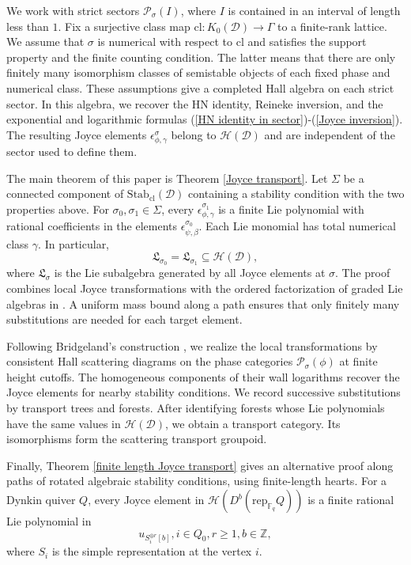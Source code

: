 \documentclass[a4paper,12pt]{amsart}
\numberwithin{equation}{section}
\newcommand{\rep}{\mathrm{rep}}
\newcommand{\Stab}{\mathrm{Stab}}
\newcommand{\cl}{\mathrm{cl}}
\newcommand{\1}{\mathbf{1}}
\begin{document}
We work with strict sectors $\mathcal{P}_\sigma(I)$, where $I$ is contained in an interval of length less than $1$. Fix a surjective class map $\cl:K_0(\mathcal{D})\rightarrow\Gamma$ to a finite-rank lattice. We assume that $\sigma$ is numerical with respect to $\cl$ and satisfies the support property and the finite counting condition. The latter means that there are only finitely many isomorphism classes of semistable objects of each fixed phase and numerical class. These assumptions give a completed Hall algebra on each strict sector. In this algebra, we recover the HN identity, Reineke inversion, and the exponential and logarithmic formulas (\ref{HN identity in sector})-(\ref{Joyce inversion}). The resulting Joyce elements $\epsilon^\sigma_{\phi,\gamma}$ belong to $\mathcal{H}(\mathcal{D})$ and are independent of the sector used to define them.

The main theorem of this paper is Theorem \ref{Joyce transport}. Let $\Sigma$ be a connected component of $\Stab_\cl(\mathcal{D})$ containing a stability condition with the two properties above. For $\sigma_0,\sigma_1\in\Sigma$, every $\epsilon^{\sigma_1}_{\phi,\gamma}$ is a finite Lie polynomial with rational coefficients in the elements $\epsilon^{\sigma_0}_{\psi,\beta}$. Each Lie monomial has total numerical class $\gamma$. In particular,
\[\mathfrak{L}_{\sigma_0}=\mathfrak{L}_{\sigma_1}\subseteq\mathcal{H}(\mathcal{D}),\]
where $\mathfrak{L}_\sigma$ is the Lie subalgebra generated by all Joyce elements at $\sigma$. The proof combines local Joyce transformations with the ordered factorization of graded Lie algebras in \cite{KS2008}. A uniform mass bound along a path ensures that only finitely many substitutions are needed for each target element.

Following Bridgeland's construction \cite{Bri2017}, we realize the local transformations by consistent Hall scattering diagrams on the phase categories $\mathcal{P}_\sigma(\phi)$ at finite height cutoffs. The homogeneous components of their wall logarithms recover the Joyce elements for nearby stability conditions. We record successive substitutions by transport trees and forests. After identifying forests whose Lie polynomials have the same values in $\mathcal{H}(\mathcal{D})$, we obtain a transport category. Its isomorphisms form the scattering transport groupoid.

Finally, Theorem \ref{finite length Joyce transport} gives an alternative proof along paths of rotated algebraic stability conditions, using finite-length hearts. For a Dynkin quiver $Q$, every Joyce element in $\mathcal{H}(D^b(\rep_{\mathbb{F}_q}Q))$ is a finite rational Lie polynomial in
\[u_{S_i^{\oplus r}[b]},i\in Q_0,r\geqslant1,b\in\mathbb{Z},\]
where $S_i$ is the simple representation at the vertex $i$.
\end{document}
